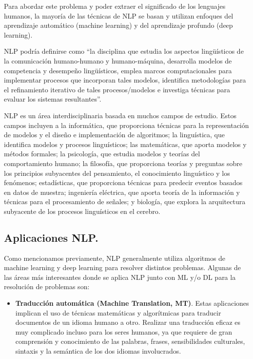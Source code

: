 \documentclass[12pt,a4paper]{article}
\begin{document}
\begin{sloppypar}
Para abordar este problema y poder extraer el significado de los lenguajes humanos, la mayoría de las técnicas de NLP se basan y utilizan enfoques del aprendizaje automático (machine learning) y del aprendizaje profundo (deep learning)\cite{NLP_1, NLP_2}.

NLP podría definirse como ``la disciplina que estudia los aspectos lingüísticos de la comunicación humano-humano y humano-máquina, desarrolla modelos de competencia y desempeño lingüísticos, emplea marcos computacionales para implementar procesos que incorporan tales modelos, identifica metodologías para el refinamiento iterativo de tales procesos/modelos e investiga técnicas para evaluar los sistemas resultantes''\cite{NLP_3_4}.

NLP es un área interdisciplinaria basada en muchos campos de estudio. Estos campos incluyen a la informática, que proporciona técnicas para la representación de modelos y el diseño e implementación de algoritmos; la linguística, que identifica modelos y procesos linguísticos; las matemáticas, que aporta modelos y métodos formales; la psicología, que estudia modelos y teorías del comportamiento humano; la filosofía, que proporciona teorías y preguntas sobre los principios subyacentes del pensamiento, el conocimiento linguístico y los fenómenos; estadísticas, que proporciona técnicas para predecir eventos basados en datos de muestra; ingeniería eléctrica, que aporta teoría de la información y técnicas para el procesamiento de señales; y biología, que explora la arquitectura subyacente de los procesos linguísticos en el cerebro\cite{NLP_3_4}.

\cleardoublepage

\subsection{Aplicaciones NLP.}\label{Aplicaciones_NLP}

Como mencionamos previamente, NLP generalmente utiliza algoritmos de machine learning y deep learning para resolver distintos problemas. Algunas de las áreas más interesantes donde se aplica NLP junto con ML y/o DL para la resolución de problemas son\cite{NLP_5, NLP_6}:

\begin{itemize}
\item \textbf{Traducción automática (Machine Translation, MT)}. Estas aplicaciones implican el uso de técnicas matemáticas y algorítmicas para traducir documentos de un idioma humano a otro. Realizar una traducción eficaz es muy complicado incluso para los seres humanos, ya que requiere de gran comprensión y conocimiento de las palabras, frases, sensibilidades culturales, sintaxis y la semántica de los dos idiomas involucrados. 


\end{itemize}
\end{sloppypar}
\end{document}
